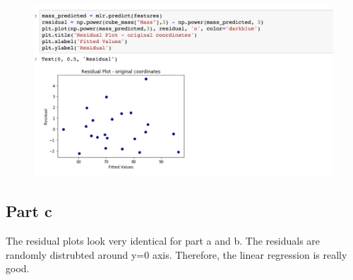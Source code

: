 \documentclass{article}      %
\begin{document}
\begin{figure}[H]
\centering
\includegraphics[width=\textwidth]{part10}
\end{figure}

\subsection{Part c} The residual plots look very identical for part a and b. The residuals are randomly distrubted around y=0 axis. Therefore, the linear regression is really good.
 
\end{document}
